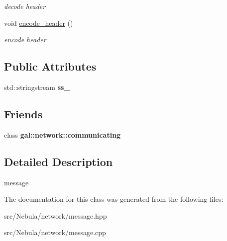 \begin{DoxyCompactItemize}
\begin{DoxyCompactList}\small\item\em decode header \end{DoxyCompactList}\item 
\hypertarget{classgal_1_1network_1_1message_a1bf10df7093930f183100b78a0251cd2}{void \hyperlink{classgal_1_1network_1_1message_a1bf10df7093930f183100b78a0251cd2}{encode\-\_\-header} ()}\label{classgal_1_1network_1_1message_a1bf10df7093930f183100b78a0251cd2}

\begin{DoxyCompactList}\small\item\em encode header \end{DoxyCompactList}\end{DoxyCompactItemize}
\subsection*{\-Public \-Attributes}
\begin{DoxyCompactItemize}
\item 
\hypertarget{classgal_1_1network_1_1message_a939d7b5d4f7dd24dbe4dd4be8e719da8}{std\-::stringstream {\bfseries ss\-\_\-}}\label{classgal_1_1network_1_1message_a939d7b5d4f7dd24dbe4dd4be8e719da8}

\end{DoxyCompactItemize}
\subsection*{\-Friends}
\begin{DoxyCompactItemize}
\item 
\hypertarget{classgal_1_1network_1_1message_a8963f6c475f2812300781c41bc93ae55}{class {\bfseries gal\-::network\-::communicating}}\label{classgal_1_1network_1_1message_a8963f6c475f2812300781c41bc93ae55}

\end{DoxyCompactItemize}


\subsection{\-Detailed \-Description}
message 

\-The documentation for this class was generated from the following files\-:\begin{DoxyCompactItemize}
\item 
src/\-Nebula/network/message.\-hpp\item 
src/\-Nebula/network/message.\-cpp\end{DoxyCompactItemize}
